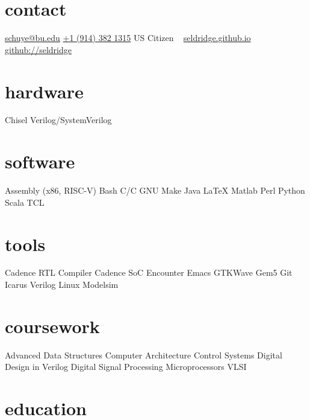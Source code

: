 \documentclass[]{friggeri-cv} %
\begin{document}


\newcommand{\CPP}
{C\nolinebreak[4]\hspace{-.05em}\raisebox{.22ex}{\footnotesize ++}\xspace}

\begin{aside} %
\section{contact}
\href{mailto:schuye@bu.edu}{schuye@bu.edu}
\href{tel:+19143821315}{+1 (914) 382 1315}
US Citizen
~
\href{https://seldridge.github.io}{seldridge.github.io}
\href{https://github.com/seldridge}{github://seldridge}
\section{hardware}
Chisel
Verilog/SystemVerilog
\section{software}
Assembly (x86, RISC-V)
Bash
C/\CPP
GNU Make
Java
\LaTeX
Matlab
Perl
Python
Scala
TCL
\section{tools}
Cadence RTL Compiler
Cadence SoC Encounter
Emacs
GTKWave
Gem5
Git
Icarus Verilog
Linux
Modelsim
\section{coursework}
Advanced Data Structures
Computer Architecture
Control Systems
Digital Design in Verilog
Digital Signal Processing
Microprocessors
VLSI
\end{aside}


\section{education}
\end{document}
